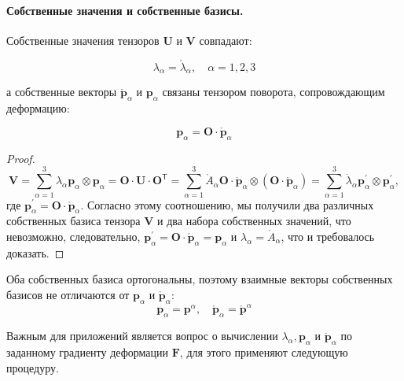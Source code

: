 \paragraph{Собственные значения и собственные базисы.}
\begin{theorem*}
  Собственные значения тензоров $\mathbf{U}$ и $ \mathbf{V} $ совпадают:

\[
\lambda_{\alpha}=\mathring{\lambda}_{\alpha}, \quad \alpha=1,2,3
\]

а собственные векторы $\mathring{\mathbf{p}}_{\alpha}$ и $\mathbf{p}_{\alpha}$ связаны тензором поворота, сопровождающим деформацию:

\[
\mathbf{p}_{\alpha}=\mathbf{O} \cdot \mathring{\mathbf{p}}_{\alpha}
\]
\end{theorem*}
\begin{proof} 
\[
\mathbf{V}=\sum_{\alpha=1}^{3} \lambda_{\alpha} \mathbf{p}_{\alpha} \otimes
\mathbf{p}_{\alpha}=\mathbf{O} \cdot \mathbf{U} \cdot
\mathbf{O}^{\mathsf{T}}=\sum_{\alpha=1}^{3} \mathring{A}_{\alpha} \mathbf{O} \cdot \mathring{\mathbf{p}}_{\alpha} \otimes\left(\mathbf{O} \cdot \mathring{\mathbf{p}}_{\alpha}\right)=\sum_{\alpha=1}^{3} \dot{\lambda}_{\alpha} \mathbf{p}_{\alpha}^{\prime} \otimes \mathbf{p}_{\alpha}^{\prime},
\]
где $\mathbf{p}_{\alpha}^{\prime}=\mathbf{O} \cdot
\mathring{\mathbf{p}}_{\alpha}$. Согласно этому соотношению, мы получили
два различных собственных базиса тензора $\mathbf{V}$ и два набора собственных
значений, что невозможно, следовательно,
$\mathbf{p}_{\alpha}^{\prime}=\mathbf{O} \cdot
\mathring{\mathbf{p}}_{\alpha}=\mathbf{p}_{\alpha}$ и
$\lambda_{\alpha}=\mathring{A}_{\alpha}$, что и требовалось доказать.
\end{proof}

Оба собственных базиса ортогональны, поэтому взаимные векторы собственных
базисов не отличаются от $\mathbf{p}_{\alpha}$ и $\mathring{\mathbf{p}}_{\alpha}$:
\[
\mathbf{p}_{\alpha}=\mathbf{p}^{\alpha}, \quad \mathring{\mathbf{p}}_{\alpha}=\mathring{\mathbf{p}}^{\alpha}
\]

Важным для приложений является вопрос о вычислении $\lambda_{\alpha}, \mathbf{p}_{\alpha}$ и $\mathring{\mathbf{p}}_{\alpha}$ по заданному градиенту деформации $\mathbf{F}$, для этого применяют следующую процедуру.


